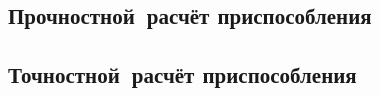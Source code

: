 \documentclass[14pt,russian,a4paper]{extreport}
\begin{document}
\subsection{Прочностной расчёт приспособления}
\subsection{Точностной расчёт приспособления}



\nocite{malvyat:okp}

\nocite{burtsev:tm2}
\nocite{bezyazichny:otm}
\nocite{blumenstejn:pto}
\nocite{kosilova:stm2}
\nocite{tarabarin:pto}
\nocite{gost:2-121-73}
\nocite{gost:14-205-83}
\nocite{gost:3-1404-86}
\nocite{gost:3-1118-88}
\nocite{gost:2-105-95}
\nocite{gost:3-1702-79}

\printbibliography[heading=none]
\end{document}
